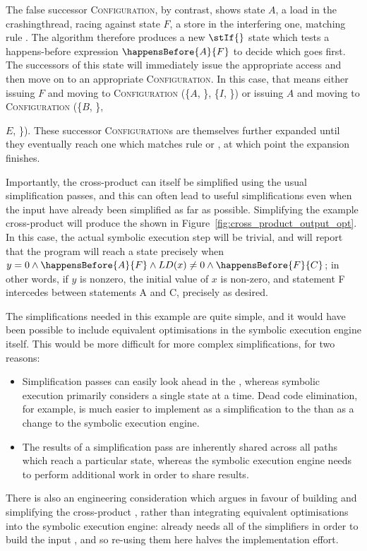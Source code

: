 The false successor \textsc{Configuration}, by contrast, shows state
$A$, a load in the \gls{crashingthread}, racing against state $F$, a
store in the interfering one, matching rule .  The
algorithm therefore produces a new $\stIf{}$ state which tests a
happens-before expression $\happensBefore{A}{F}$ to decide which
{\StateMachine} goes first.  The successors of this state will
immediately issue the appropriate access and then move on to an
appropriate \textsc{Configuration}.  In this case, that means either
issuing $F$ and moving to \textsc{Configuration} (\{$A$, {\false}\},
\{$I$, {\true}\}) or issuing $A$ and moving to \textsc{Configuration}
(\{$B$, {\true}\}, {$E$, {\false}\}).  These successor
  \textsc{Configuration}s are themselves further expanded until they
  eventually reach one which matches rule  or ,
  at which point the expansion finishes.

Importantly, the cross-product {\StateMachine} can itself be
simplified using the usual {\StateMachine} simplification passes, and
this can often lead to useful simplifications even when the input
{\StateMachines} have already been simplified as far as possible.
Simplifying the example cross-product {\StateMachine} will produce the
{\StateMachine} shown in Figure~\ref{fig:cross_product_output_opt}.
In this case, the actual symbolic execution step will be trivial, and
will report that the program will reach a {\stCrash} state precisely
when $y = 0 \wedge \happensBefore{A}{F} \wedge LD(x) \not= 0 \wedge
\happensBefore{F}{C}$; in other words, if $y$ is nonzero, the initial
value of $x$ is non-zero, and statement F intercedes between
statements A and C, precisely as desired.

The simplifications needed in this example are quite simple, and it
would have been possible to include equivalent optimisations in the
symbolic execution engine itself.  This would be more difficult for
more complex simplifications, for two reasons:
\begin{itemize}
\item Simplification passes can easily look ahead in the
  {\StateMachine}, whereas symbolic execution primarily considers a
  single state at a time.  Dead code elimination, for example, is much
  easier to implement as a simplification to the {\StateMachine} than
  as a change to the symbolic execution engine.
\item The results of a simplification pass are inherently shared
  across all paths which reach a particular state, whereas the
  symbolic execution engine needs to perform additional work in order
  to share results.
\end{itemize}
There is also an engineering consideration which argues in favour of
building and simplifying the cross-product {\StateMachine}, rather
than integrating equivalent optimisations into the symbolic execution
engine: {\implementation} already needs all of the simplifiers in
order to build the input {\StateMachines}, and so re-using them here
halves the implementation effort.

}

